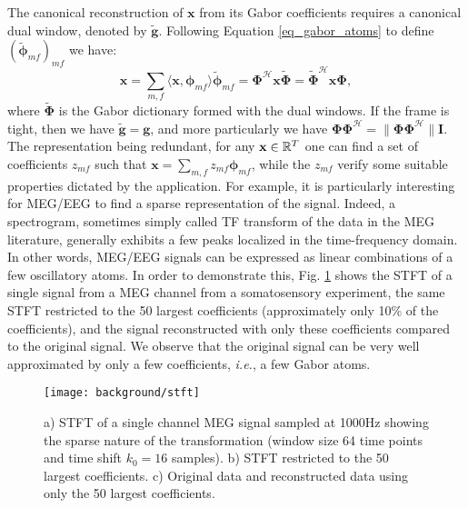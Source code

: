 The canonical reconstruction of $\mathbf{x}$ from its Gabor coefficients requires a canonical dual window, denoted by $\mathbf{\tilde{g}}$. Following Equation \eqref{eq_gabor_atoms} to define $(\tilde{\mathbf{\phi}}_{mf})_{mf}$ we have:
\begin{equation} \label{eq_TF_recons}
	\mathbf{x}=\sum_{m,f}\langle\mathbf{x}, \mathbf{\phi}_{mf}\rangle\tilde{\mathbf{\phi}}_{mf}=\mathbf{\Phi}^{\mathcal{H}}\mathbf{x\tilde{\Phi}}=\tilde{\mathbf{\Phi}}^{\mathcal{H}}\mathbf{x\Phi},
\end{equation}
where $\tilde{\mathbf{\Phi}}$ is the Gabor dictionary formed with the dual windows. If the frame is tight, then we have $\tilde{\mathbf{g}}=\mathbf{g}$, and more particularly we have $\mathbf{\Phi\Phi}^{\mathcal{H}}=\|\mathbf{\Phi\Phi}^{\mathcal{H}}\|\mathbf{I}$. The representation being redundant, for any $\mathbf{x}\in\mathbb{R}^T$ one can find a set of coefficients $z_{mf}$ such that $\mathbf{x}=\sum_{m,f}z_{mf}\mathbf{\phi}_{mf}$, while the $z_{mf}$ verify some suitable properties dictated by the application. For example, it is particularly interesting for MEG/EEG to find a sparse representation of the signal. Indeed, a spectrogram, sometimes simply called TF transform of the data in the MEG literature, generally exhibits a few peaks localized in the time-frequency domain. In other words, MEG/EEG signals can be expressed as linear combinations of a few oscillatory atoms. In order to demonstrate this, Fig. \ref{fig:stft} shows the STFT of a single signal from a MEG channel from a somatosensory experiment, the same STFT restricted to the 50 largest coefficients (approximately only 10\% of the coefficients), and the signal reconstructed with only these coefficients compared to the original signal. We observe that the original signal can be very well approximated by only a few coefficients, \textit{i.e.}, a few Gabor atoms.

\begin{figure}
\centering
	\texttt{[image: background/stft]}
    \caption{a) STFT of a single channel MEG signal sampled at 1000Hz showing the sparse nature of the transformation (window size 64 time points and time shift $k_0=16$ samples). b) STFT restricted to the 50 largest coefficients. c) Original data and reconstructed data using only the 50 largest coefficients.}
	\label{fig:stft}
\end{figure}

